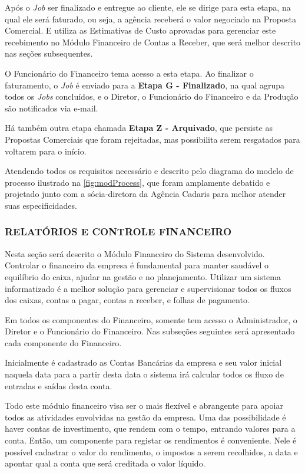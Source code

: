 \documentclass[
  12pt,				%
  openany,
  oneside,
  a4paper,			%
  english,			%
  brazil
]{article}
\numberwithin{figure}{section}
\numberwithin{table}{section}
\newcounter{subsubsubsection}[subsubsection]
\begin{document}

Após o \textit{Job} ser finalizado e entregue ao cliente, ele se dirige para esta etapa, na qual ele será faturado, ou seja, a agência receberá o valor negociado na Proposta Comercial. E utiliza as Estimativas de Custo aprovadas para gerenciar este recebimento no Módulo Financeiro de Contas a Receber, que será melhor descrito nas seções subsequentes. 

O Funcionário do Financeiro tema acesso a esta etapa. Ao finalizar o faturamento, o \textit{Job} é enviado para a \textbf{Etapa G - Finalizado}, na qual agrupa todos os \textit{Jobs} concluídos, e o Diretor, o Funcionário do Financeiro e da Produção são notificados via e-mail. 

Há também outra etapa chamada \textbf{Etapa Z - Arquivado}, que persiste as Propostas Comerciais que foram rejeitadas, mas possibilita serem resgatados para voltarem para o início.

Atendendo todos os requisitos necessário e descrito pelo diagrama do modelo de processo ilustrado na \autoref{fig:modProcess}, que foram amplamente debatido e projetado junto com a sócia-diretora da Agência Cadaris para melhor atender suas especificidades.



\subsubsection{RELATÓRIOS E CONTROLE FINANCEIRO}

Nesta seção será descrito o Módulo Financeiro do Sistema desenvolvido. Controlar o financeiro da empresa é fundamental para manter saudável o equilíbrio do caixa, ajudar na gestão e no planejamento. Utilizar um sistema informatizado é a melhor solução para gerenciar e supervisionar todos os fluxos dos caixas, contas a pagar, contas a receber, e folhas de pagamento.

Em todos os componentes do Financeiro, somente tem acesso o Administrador, o Diretor e o Funcionário do Financeiro. Nas subseções seguintes será apresentado cada componente do Financeiro.



Inicialmente é cadastrado as Contas Bancárias da empresa e seu valor inicial naquela data para a partir desta data o sistema irá calcular todos os fluxo de entradas e saídas desta conta.

Todo este módulo financeiro visa ser o mais flexível e abrangente para apoiar todos as atividades envolvidas na gestão da empresa. Uma das possibilidade é haver contas de investimento, que rendem com o tempo, entrando valores para a conta. Então, um componente para registar os rendimentos é conveniente. Nele é possível cadastrar o valor do rendimento, o impostos a serem recolhidos, a data e apontar qual a conta que será creditada o valor líquido.
\end{document}
